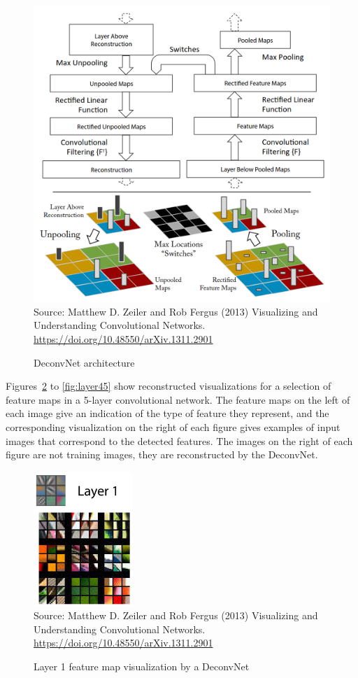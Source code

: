 \begin{figure}
\centering
\includegraphics[width=.66\textwidth]{screen13.png} \\

\vspace{\baselineskip}
\scriptsize Source: Matthew D. Zeiler and Rob Fergus (2013) Visualizing and Understanding Convolutional Networks. \url{https://doi.org/10.48550/arXiv.1311.2901}
\caption{DeconvNet architecture}
\label{fig:screen13}
\end{figure}

Figures~\ref{fig:layer1} to \ref{fig:layer45} show reconstructed visualizations for a selection of feature maps in a 5-layer convolutional network. The feature maps on the left of each image give an indication of the type of feature they represent, and the corresponding visualization on the right of each figure gives examples of input images that correspond to the detected features. The images on the right of each figure are not training images, they are reconstructed by the DeconvNet.

\begin{figure}
\centering
\includegraphics[height=2in]{layer1.png} \\
\vspace{\baselineskip}
\scriptsize Source: Matthew D. Zeiler and Rob Fergus (2013) Visualizing and Understanding Convolutional Networks. \url{https://doi.org/10.48550/arXiv.1311.2901}
\caption{Layer 1 feature map visualization by a DeconvNet}
\label{fig:layer1}
\end{figure}

